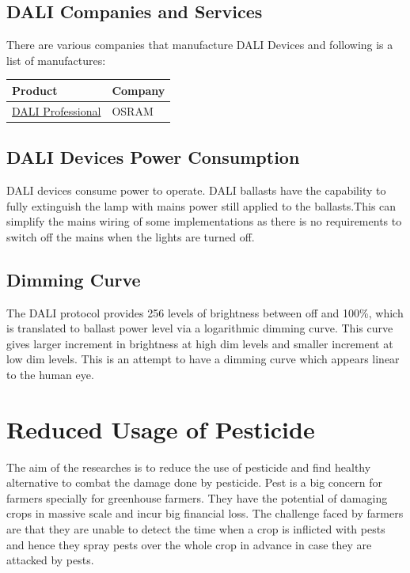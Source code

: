 \documentclass{article}
\begin{document}
\subsection{DALI Companies and Services}
There are various companies that manufacture DALI Devices and following is a list of manufactures:

\begin{tabular}{|l|l|}
\hline
\textbf{Product} & \textbf{Company} \\ \hline
\href{http://www.osram.com/osram_com/news-and-knowledge/light-management-installation-made-easy/installing-light-management-in-commercial-enterprises/index.jsp}{DALI Professional} & OSRAM \\ \hline
\end{tabular}

\subsection{DALI Devices Power Consumption}
DALI devices consume power to operate. DALI ballasts have the capability to fully extinguish the lamp with mains power still applied to the ballasts.This can simplify the mains wiring of some implementations as there is no requirements to switch off the mains when the lights are turned off.

\subsection{Dimming Curve}
The DALI protocol provides 256 levels of brightness between off and 100\%, which is translated to ballast power level via a logarithmic dimming curve. This curve gives larger increment in brightness at high dim levels and smaller increment at low dim levels. This is an attempt to have a dimming curve which appears linear to the human eye.


\section{Reduced Usage of Pesticide}
The aim of the researches is to reduce the use of pesticide and find healthy alternative to combat the damage done by pesticide. Pest is a big concern for farmers specially for greenhouse farmers. They have the potential of damaging crops in massive scale and incur big financial loss. The challenge faced by farmers are that they are unable to detect the time when a crop is inflicted with pests and hence they spray pests over the whole crop in advance in case they are attacked by pests.
\end{document}
